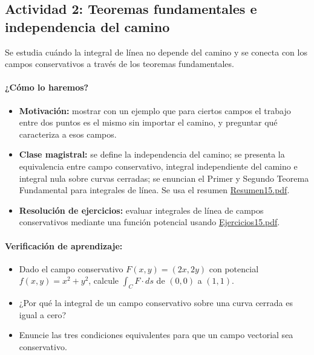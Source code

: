 \documentclass[a4,11pt]{aleph-notas}
\begin{document}
\subsection*{Actividad 2: Teoremas fundamentales e independencia del camino}
Se estudia cuándo la integral de línea no depende del camino y se conecta con los campos conservativos a través de los teoremas fundamentales.

\paragraph{¿Cómo lo haremos?}
\begin{itemize}[leftmargin=*]
    \item \textbf{Motivación:} mostrar con un ejemplo que para ciertos campos el trabajo entre dos puntos es el mismo sin importar el camino, y preguntar qué caracteriza a esos campos.
    \item \textbf{Clase magistral:} se define la independencia del camino; se presenta la equivalencia entre campo conservativo, integral independiente del camino e integral nula sobre curvas cerradas; se enuncian el Primer y Segundo Teorema Fundamental para integrales de línea. Se usa el resumen \href{https://andres-merino.github.io/MatematicaIII-05-N0051/01Resumen/Resumen15.pdf}{Resumen15.pdf}.
    \item \textbf{Resolución de ejercicios:} evaluar integrales de línea de campos conservativos mediante una función potencial usando \href{https://andres-merino.github.io/MatematicaIII-05-N0051/04Ejercicios/Ejercicios15.pdf}{Ejercicios15.pdf}.
\end{itemize}

\paragraph{Verificación de aprendizaje:}
\begin{itemize}[leftmargin=*]
    \item Dado el campo conservativo $F(x,y)=(2x,2y)$ con potencial $f(x,y)=x^2+y^2$, calcule $\int_C F\cdot ds$ de $(0,0)$ a $(1,1)$.
    \item ¿Por qué la integral de un campo conservativo sobre una curva cerrada es igual a cero?
    \item Enuncie las tres condiciones equivalentes para que un campo vectorial sea conservativo.
\end{itemize}

\end{document}
